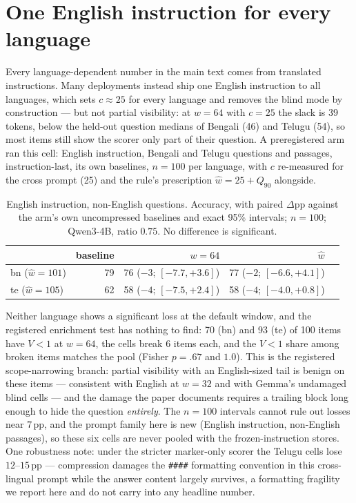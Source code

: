 \documentclass{article}
\begin{document}
\section{One English instruction for every language}
\label{app:xinstr}

Every language-dependent number in the main text comes from translated
instructions. Many deployments instead ship one English instruction to
all languages, which sets $c \approx 25$ for every language and removes
the blind mode by construction --- but not partial visibility: at
$w{=}64$ with $c{=}25$ the slack is 39 tokens, below the held-out
question medians of Bengali (46) and Telugu (54), so most items still
show the scorer only part of their question. A preregistered arm ran
this cell: English instruction, Bengali and Telugu questions and
passages, instruction-last, its own baselines, $n{=}100$ per language,
with $c$ re-measured for the cross prompt (25) and the rule's
prescription $\hat w = 25 + Q_{90}$ alongside.

\begin{table}[h]
\caption{English instruction, non-English questions. Accuracy, with
paired $\Delta$pp against the arm's own uncompressed baselines and
exact 95\% intervals; $n{=}100$; Qwen3-4B, ratio $0.75$. No difference
is significant.}
\label{tab:xinstr}
\centering
\small
\begin{tabular}{lrrrr}
\toprule
 & baseline & $w{=}64$ & $\hat w$ & \\
\midrule
bn ($\hat w{=}101$) & 79 & 76 (${-}3$; $[-7.7,+3.6]$) & 77 (${-}2$; $[-6.6,+4.1]$) & \\
te ($\hat w{=}105$) & 62 & 58 (${-}4$; $[-7.5,+2.4]$) & 58 (${-}4$; $[-4.0,+0.8]$) & \\
\bottomrule
\end{tabular}
\end{table}

Neither language shows a significant loss at the default window, and
the registered enrichment test has nothing to find: 70 (bn) and 93 (te)
of 100 items have $V<1$ at $w{=}64$, the cells break 6 items each, and
the $V{<}1$ share among broken items matches the pool (Fisher $p{=}.67$
and $1.0$). This is the registered scope-narrowing branch: partial
visibility with an English-sized tail is benign on these items ---
consistent with English at $w{=}32$ and with Gemma's undamaged blind
cells --- and the damage the paper documents requires a trailing block
long enough to hide the question \emph{entirely}. The $n{=}100$
intervals cannot rule out losses near $7$\,pp, and the prompt family
here is new (English instruction, non-English passages), so these six
cells are never pooled with the frozen-instruction stores. One
robustness note: under the stricter marker-only scorer the Telugu
cells lose $12$--$15$\,pp --- compression damages the \texttt{\#\#\#\#}
formatting convention in this cross-lingual prompt while the answer
content largely survives, a formatting fragility we report here and do
not carry into any headline number.
\end{document}
